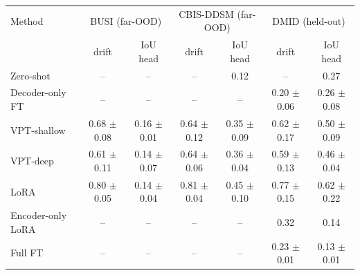 \begin{tabular}{lcccccc}
\toprule
Method & \multicolumn{2}{c}{BUSI (far-OOD)} & \multicolumn{2}{c}{CBIS-DDSM (far-OOD)} & \multicolumn{2}{c}{DMID (held-out)} \\
 & drift & IoU head & drift & IoU head & drift & IoU head \\
\midrule
Zero-shot & -- & -- & -- & 0.12 & -- & 0.27 \\
Decoder-only FT & -- & -- & -- & -- & 0.20 $\pm$ 0.06 & 0.26 $\pm$ 0.08 \\
VPT-shallow & 0.68 $\pm$ 0.08 & 0.16 $\pm$ 0.01 & 0.64 $\pm$ 0.12 & 0.35 $\pm$ 0.09 & 0.62 $\pm$ 0.17 & 0.50 $\pm$ 0.09 \\
VPT-deep & 0.61 $\pm$ 0.11 & 0.14 $\pm$ 0.07 & 0.64 $\pm$ 0.06 & 0.36 $\pm$ 0.04 & 0.59 $\pm$ 0.13 & 0.46 $\pm$ 0.04 \\
LoRA & 0.80 $\pm$ 0.05 & 0.14 $\pm$ 0.04 & 0.81 $\pm$ 0.04 & 0.45 $\pm$ 0.10 & 0.77 $\pm$ 0.15 & 0.62 $\pm$ 0.22 \\
Encoder-only LoRA & -- & -- & -- & -- & 0.32 & 0.14 \\
Full FT & -- & -- & -- & -- & 0.23 $\pm$ 0.01 & 0.13 $\pm$ 0.01 \\
\bottomrule
\end{tabular}
